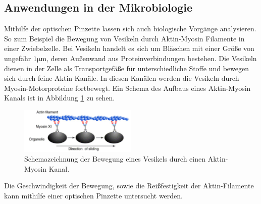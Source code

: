 \subsection{Anwendungen in der Mikrobiologie}
Mithilfe der optischen Pinzette lassen sich auch biologische Vorgänge analysieren. So zum Beispiel die Bewegung von Vesikeln durch Aktin-Myosin Filamente in einer Zwiebelzelle. Bei Vesikeln handelt es sich um Bläschen mit einer Größe von ungefähr $1 \si{\micro\meter}$, deren Außenwand aus Proteinverbindungen bestehen. Die Vesikeln dienen in der Zelle als Transportgefäße für unterschiedliche Stoffe und bewegen sich durch feine Aktin Kanäle. In diesen Kanälen werden die Vesikeln durch Myosin-Motorproteine fortbewegt. Ein Schema des Aufbaus eines Aktin-Myosin Kanals ist in Abbildung \ref{fig:aktin} zu sehen.
\begin{figure}[H]
  \centering
  \includegraphics[width=0.5\textwidth]{plots/aktin.jpg}
  \caption{Schemazeichnung der Bewegung eines Vesikels durch einen Aktin-Myosin Kanal. \cite{anleitung}}
  \label{fig:aktin}
\end{figure}
Die Geschwindigkeit der Bewegung, sowie die Reißfestigkeit der Aktin-Filamente kann mithilfe einer optischen Pinzette untersucht werden. \cite{anleitung}
